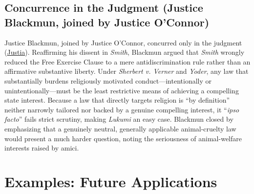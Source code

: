 \documentclass[12pt]{article}
\begin{document}
\subsection{Concurrence in the Judgment (Justice Blackmun, joined by Justice O'Connor)}

Justice Blackmun, joined by Justice O'Connor, concurred only in the judgment (\href{https://supreme.justia.com/cases/federal/us/508/520/}{Justia}). Reaffirming his dissent in \textit{Smith}, Blackmun argued that \textit{Smith} wrongly reduced the Free Exercise Clause to a mere antidiscrimination rule rather than an affirmative substantive liberty. Under \textit{Sherbert v. Verner} and \textit{Yoder}, any law that substantially burdens religiously motivated conduct---intentionally or unintentionally---must be the least restrictive means of achieving a compelling state interest. Because a law that directly targets religion is ``by definition'' neither narrowly tailored nor backed by a genuine compelling interest, it ``\textit{ipso facto}'' fails strict scrutiny, making \textit{Lukumi} an easy case. Blackmun closed by emphasizing that a genuinely neutral, generally applicable animal-cruelty law would present a much harder question, noting the seriousness of animal-welfare interests raised by amici.

\section{Examples: Future Applications}
\end{document}

